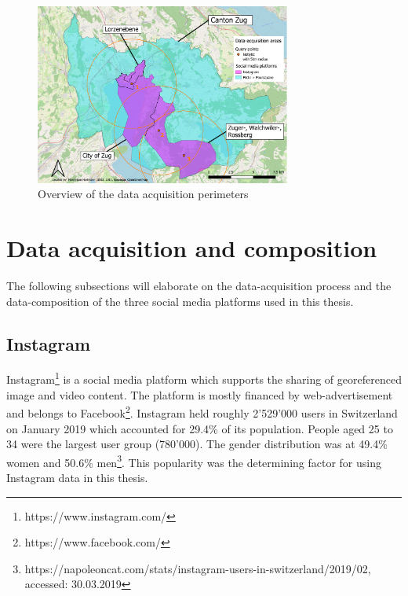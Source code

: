 \begin{figure}[h]
   \centering
   \includegraphics[width=0.75\textwidth]{img/overview_research_area_w_Lorzenebene}
   \caption{Overview of the data acquisition perimeters}
   \label{fig:research_area}
\end{figure}


\section{Data acquisition and composition} \label{data_acquisition}
The following subsections will elaborate on the data-acquisition process and the data-composition of the three social media platforms used in this thesis. 

\subsection{Instagram} \label{instagram}
Instagram\footnote{https://www.instagram.com/} is a social media platform which supports the sharing of georeferenced image and video content. The platform is mostly financed by web-advertisement and belongs to Facebook\footnote{https://www.facebook.com/}. Instagram held roughly 2'529'000 users in Switzerland on January 2019 which accounted for 29.4\% of its population. People aged 25 to 34 were the largest user group (780'000). The gender distribution was at 49.4\% women and 50.6\% men\footnote{https://napoleoncat.com/stats/instagram-users-in-switzerland/2019/02, accessed: 30.03.2019}. This popularity was the determining factor for using Instagram data in this thesis.\\

